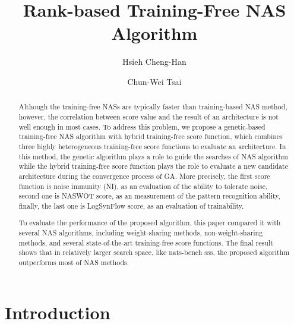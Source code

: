 \documentclass[sigconf]{acmart}
\begin{document}
\title{Rank-based Training-Free NAS Algorithm}

\author{Hsieh Cheng-Han}

\author{Chun-Wei Tsai}

\begin{abstract}

    Although the training-free NASs are typically faster than training-based 
    NAS method, however, the correlation between score value and the result 
    of an architecture is not well enough in most cases.
    To address this problem, we propose a genetic-based training-free NAS 
    algorithm with hybrid training-free score function, which combines three 
    highly heterogeneous training-free score functions to evaluate an architecture. 
    In this method, the genetic algorithm plays a role to guide the searches 
    of NAS algorithm while the hybrid training-free score function plays the 
    role to evaluate a new candidate architecture during the convergence process 
    of GA. More precisely, the first score function is noise immunity (NI), as 
    an evaluation of the ability to tolerate noise, second one is NASWOT score, as 
    an measurement of the pattern recognition ability, finally, the last one is 
    LogSynFlow score, as an evaluation of trainability. 
    
    To evaluate the performance of the proposed algorithm, this paper compared 
    it with several NAS algorithms, including weight-sharing methods, 
    non-weight-sharing methods, and several state-of-the-art training-free score 
    functions. 
    The final result shows that in relatively larger search space, like nats-bench sss, the 
    proposed algorithm outperforms most of NAS methods. 

\end{abstract}
\maketitle

\section{Introduction}
\label{sec:introduction}
\end{document}
